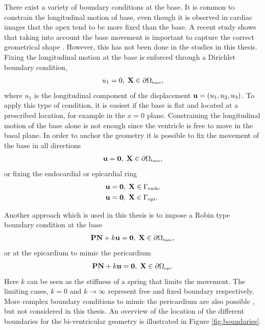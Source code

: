There exist a variety of boundary conditions at the base.
It is common to constrain the longitudinal motion of
base, even though it is observed in cardiac images that the apex tend
to be more fixed than the base. A recent study shows that taking into
account the base movement is important to capture the correct
geometrical shape \cite{palit2016passive}. However, this has not been
done in the studies in this thesis.
Fixing the longitudinal motion at the base is enforced through a
Dirichlet boundary condition,
\begin{align}
  u_1 = 0,  \;  \mathbf{X} \in \partial \Omega_{ \textnormal{\tiny\text{base}}},
\end{align}
where $u_1$ is the longitudinal component of the displacement $\mathbf{u} =
(u_1, u_2, u_3)$. To apply this type of condition, it is easiest if
the base is flat and located at a prescribed location, for example in
the $x= 0$ plane. Constraining the longitudinal motion of the base
alone is not enough since the ventricle is free to move in the basal
plane. In order to anchor the geometry it is possible to fix the
movement of the base in all directions
\begin{align}
  \mathbf{u} = \mathbf{0},  \;  \mathbf{X} \in \partial \Omega_{ \textnormal{\tiny\text{base}}},
\end{align}
or fixing the endocardial or epicardial ring
\begin{align}
  \mathbf{u} &= \mathbf{0},  \;  \mathbf{X} \in \Gamma_{\mathrm{endo}} \\
  \mathbf{u} &= \mathbf{0},  \;  \mathbf{X} \in \Gamma_{\mathrm{epi}}.
\end{align}

Another approach which is used in this thesis is to impose a Robin
type boundary condition at the base
\begin{align}
  \mathbf{P} \mathbf{N} + k \mathbf{u} = \mathbf{0},  \;  \mathbf{X} \in \partial \Omega_{ \textnormal{\tiny\text{base}}}, 
\end{align}
or at the epicardium to mimic the pericardium
\begin{align}
  \mathbf{P} \mathbf{N} + k \mathbf{u} = \mathbf{0},  \;  \mathbf{X} \in \partial \Omega_{ \textnormal{\tiny \text{epi}}}.
\end{align}
Here $k$ can be seen as the stiffness of a spring that limits the
movement. The limiting cases, $k = 0$ and $k \rightarrow
\infty$ represent free and fixed boundary respectively.
More complex boundary conditions to mimic the pericardium are also
possible \cite{fritz2014simulation}, but not considered in this thesis.
An overview of the location of the different boundaries for the
bi-ventricular geometry is illustrated in Figure \ref{fig:boundaries}.


